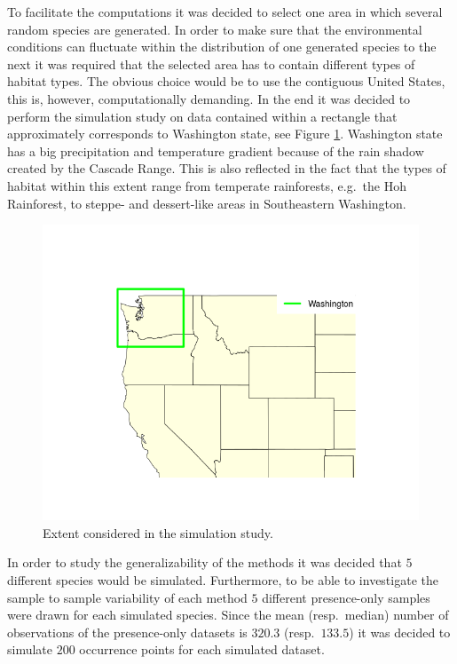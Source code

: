 To facilitate the computations it was decided to select one area in which several random species are generated. In order to make sure that the environmental conditions can fluctuate within the distribution of one generated species to the next it was required that the selected area has to contain different types of habitat types. The obvious choice would be to use the contiguous United States, this is, however, computationally demanding. In the end it was decided to perform the simulation study on data contained within a rectangle that approximately corresponds to Washington state, see Figure \ref{fig:WashState}. Washington state has a big precipitation and temperature gradient because of the rain shadow created by the Cascade Range. This is also reflected in the fact that the types of habitat within this extent range from temperate rainforests, e.g.\ the Hoh Rainforest, to steppe- and dessert-like areas in Southeastern Washington. \\

\begin{figure}[!htb]
\center
\includegraphics[scale=0.5]{Plots/WashingtonPlot.png}
\caption{\label{fig:WashState}Extent considered in the simulation study.}
\end{figure}

In order to study the generalizability of the methods it was decided that $5$ different species would be simulated. Furthermore, to be able to investigate the sample to sample variability of each method $5$ different presence-only samples were drawn for each simulated species. Since the mean (resp.\ median) number of observations of the presence-only datasets is $320.3$ (resp.\ $133.5$) it was decided to simulate $200$ occurrence points for each simulated dataset. \\

